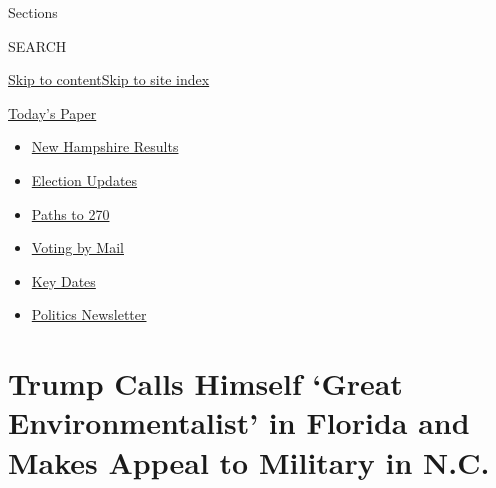 Sections

SEARCH

\protect\hyperlink{site-content}{Skip to
content}\protect\hyperlink{site-index}{Skip to site index}

\href{https://myaccount.nytimes3xbfgragh.onion/auth/login?response_type=cookie\&client_id=vi}{}

\href{https://www.nytimes3xbfgragh.onion/section/todayspaper}{Today's
Paper}

\begin{itemize}
\item
  \href{https://www.nytimes3xbfgragh.onion/interactive/2020/09/08/us/elections/results-new-hampshire-primary-elections.html?action=click\&pgtype=Article\&state=default\&region=TOP_BANNER\&context=storylines_menu}{New
  Hampshire Results}
\item
  \href{https://www.nytimes3xbfgragh.onion/live/2020/09/08/us/trump-vs-biden?action=click\&pgtype=Article\&state=default\&region=TOP_BANNER\&context=storylines_menu}{Election
  Updates}
\item
  \href{https://www.nytimes3xbfgragh.onion/interactive/2020/us/elections/election-states-biden-trump.html?action=click\&pgtype=Article\&state=default\&region=TOP_BANNER\&context=storylines_menu}{Paths
  to 270}
\item
  \href{https://www.nytimes3xbfgragh.onion/interactive/2020/08/31/us/politics/vote-by-mail-deadlines.html?action=click\&pgtype=Article\&state=default\&region=TOP_BANNER\&context=storylines_menu}{Voting
  by Mail}
\item
  \href{https://www.nytimes3xbfgragh.onion/interactive/2019/us/elections/2020-presidential-election-calendar.html?action=click\&pgtype=Article\&state=default\&region=TOP_BANNER\&context=storylines_menu}{Key
  Dates}
\item
  \href{https://www.nytimes3xbfgragh.onion/newsletters/politics?action=click\&pgtype=Article\&state=default\&region=TOP_BANNER\&context=storylines_menu}{Politics
  Newsletter}
\end{itemize}

\hypertarget{trump-calls-himself-great-environmentalist-in-florida-and-makes-appeal-to-military-in-nc}{%
\section{Trump Calls Himself `Great Environmentalist' in Florida and
Makes Appeal to Military in
N.C.}\label{trump-calls-himself-great-environmentalist-in-florida-and-makes-appeal-to-military-in-nc}}


